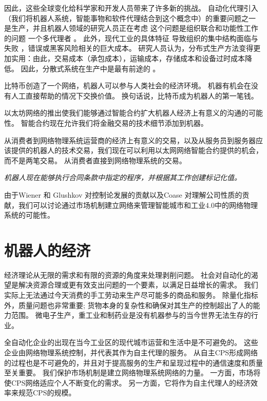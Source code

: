 \documentclass[UTF8]{article}
\begin{document}
因此，这些全球变化给科学家和开发人员带来了许多新的挑战。 自动化代理引入（我们将机器人系统，智能事物和软件代理结合到这个概念中）的重要问题之一 \cite{Leitao2015IndustrialIndustry} 是生产，并且机器人领域的研究人员正在考虑 \cite{Zhu2014RobustSystems} 这个问题是组织联合和功能性工作的问题 一个多代理者 \cite{Liu2013Multi-robotConstraints} 。 此外，现代工业的具体特征 \cite{Lasi2014Industry4.0} 导致组织的集中结构面临与失败 \cite{Khajavi2014AdditiveChain}，错误或黑客风险相关的巨大成本。 研究人员认为，分布式生产方法变得更加实用：由此，交易成本（承包成本），运输成本，存储成本和设备过时成本降低。 因此，分散式系统在生产中是最有前途的 \cite{DeGennaro2006DecentralizedSystems}。

比特币创造了一个网络，机器人可以参与人类社会的经济环境。 机器有机会在没有人工直接帮助的情况下交换价值。 换句话说，比特币成为机器人的第一笔钱\cite{Kelion2015CouldThemselves}。

以太坊网络的推出使我们能够通过智能合约扩大机器人经济上有意义的沟通的可能性\cite{Buterin2014EthereumPlatform}。 智能合约现在允许我们将金融交易的技术细节添加到机器。


从消费者到网络物理系统运营商的经济上有意义的交易，以及从服务员到服务器应该提供的机器人的技术交易，我们现在可以利用以太网网络智能合约提供的机会，而不是两笔交易。 从消费者直接到网络物理系统的交易。

\textit{机器人现在能够执行合同条款中指定的程序，并根据其工作创建标记化值。}

由于Wiener \cite{Wiener1961CyberneticsEd} 和 Glushkov \cite{SergienkoIvan2014TopicalGlushkov} 对控制论发展的贡献以及Coase \cite{Coase1937TheFirm} 对理解公司性质的贡献，我们可以讨论通过市场机制建立网络来管理智能城市和工业4.0中的网络物理系统的可能性。

\section{机器人的经济}

经济理论从无限的需求和有限的资源的角度来处理剥削问题。 社会对自动化的渴望是解决资源合理或更有效支出问题的一个要素，以满足日益增长的需求。 我们实际上无法通过今天消费的手工劳动来生产尽可能多的商品和服务。 除量化指标外，质量问题也非常重要; 货物本身的复杂性和确保对其生产的控制超出了人的能力范围。 微电子生产，重工业和制药业是没有机器参与的当今世界无法生存的行业。

全自动化企业的出现在当今工业区的现代城市运营和生活中是不可避免的。 这些企业由网络物理系统控制，并代表其作为自主代理的服务。 从自主CPS形成网络的过程也是不可避免的，并且对于提高服务的生产和呈现过程中的通信速度和质量至关重要。 我们保护市场机制是建立网络物理系统网络的力量。 一方面，市场将使CPS网络适应个人不断变化的需求。
另一方面，它将作为自主代理人的经济效率来规范CPS的规模。
\end{document}

